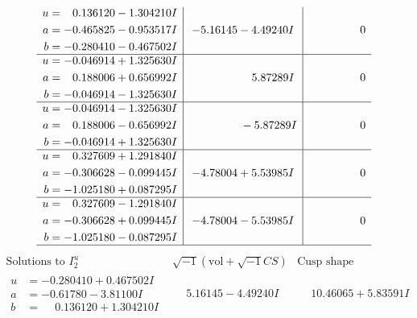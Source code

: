 \documentclass[1p]{elsarticle_modified}
\theoremstyle{definition}
\newcommand{\I}{\sqrt{-1}}
\begin{document}
$$\begin{array}{c|c|c}
\begin{aligned}
u &= \phantom{-}0.136120 - 1.304210 I \\
a &= -0.465825 - 0.953517 I \\
b &= -0.280410 - 0.467502 I\end{aligned}
 & -5.16145 - 4.49240 I & \phantom{-0.000000 } 0 \\ \hline\begin{aligned}
u &= -0.046914 + 1.325630 I \\
a &= \phantom{-}0.188006 + 0.656992 I \\
b &= -0.046914 - 1.325630 I\end{aligned}
 & \phantom{-0.000000 -}5.87289 I & \phantom{-0.000000 } 0 \\ \hline\begin{aligned}
u &= -0.046914 - 1.325630 I \\
a &= \phantom{-}0.188006 - 0.656992 I \\
b &= -0.046914 + 1.325630 I\end{aligned}
 & \phantom{-0.000000 } -5.87289 I & \phantom{-0.000000 } 0 \\ \hline\begin{aligned}
u &= \phantom{-}0.327609 + 1.291840 I \\
a &= -0.306628 - 0.099445 I \\
b &= -1.025180 + 0.087295 I\end{aligned}
 & -4.78004 + 5.53985 I & \phantom{-0.000000 } 0 \\ \hline\begin{aligned}
u &= \phantom{-}0.327609 - 1.291840 I \\
a &= -0.306628 + 0.099445 I \\
b &= -1.025180 - 0.087295 I\end{aligned}
 & -4.78004 - 5.53985 I & \phantom{-0.000000 } 0\\
 \hline 
 \end{array}$$\newpage$$\begin{array}{c|c|c}  
\text{Solutions to }I^u_{2}& \I (\text{vol} + \sqrt{-1}CS) & \text{Cusp shape}\\
 \hline 
\begin{aligned}
u &= -0.280410 + 0.467502 I \\
a &= -0.61780 - 3.81100 I \\
b &= \phantom{-}0.136120 + 1.304210 I\end{aligned}
 & \phantom{-}5.16145 - 4.49240 I & \phantom{-}10.46065 + 5.83591 I \\ \hline\begin{aligned}

\end{aligned}
\end{array}$$
\end{document}
